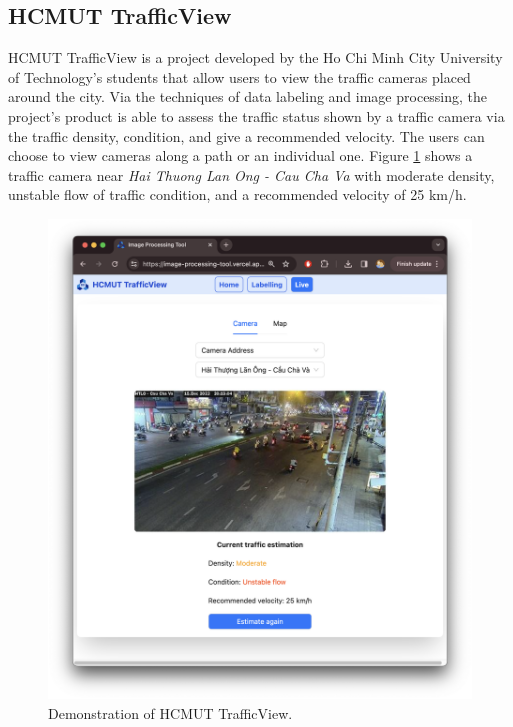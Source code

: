 \subsection{HCMUT TrafficView}
HCMUT TrafficView is a project developed by the Ho Chi Minh City University of Technology's students that allow users to view the traffic cameras placed around the city. Via the techniques of data labeling and image processing, the project's product is able to assess the traffic status shown by a traffic camera via the traffic density, condition, and give a recommended velocity. The users can choose to view cameras along a path or an individual one. \cite{hcmut_trafficview} Figure \ref{fig:trafficview_demo} shows a traffic camera near \textit{Hai Thuong Lan Ong - Cau Cha Va} with moderate density, unstable flow of traffic condition, and a recommended velocity of 25 km/h.

\begin{figure}[H]
    \centering
    \includegraphics[width=\textwidth]{assets/images/Research/trafficview/hcmut_trafficview_demo.png}
    \caption{Demonstration of HCMUT TrafficView.}
    \label{fig:trafficview_demo}
\end{figure}

